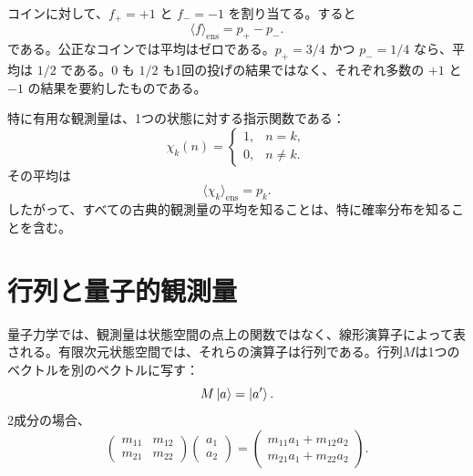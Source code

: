 コインに対して、\(f_+=+1\) と \(f_-=-1\) を割り当てる。すると
\begin{equation}
  \langle f\rangle_{\mathrm{ens}}
  =p_+-p_-.
  \label{eq:l02-coin-expectation}
\end{equation}
である。公正なコインでは平均はゼロである。\(p_+=3/4\) かつ \(p_-=1/4\) なら、平均は \(1/2\) である。\(0\) も \(1/2\) も1回の投げの結果ではなく、それぞれ多数の \(+1\) と \(-1\) の結果を要約したものである。

\begin{classroomqa}
\end{classroomqa}

特に有用な観測量は、1つの状態に対する指示関数である：
\begin{equation}
  \chi_k(n)=
  \begin{cases}
    1,&n=k,\\
    0,&n\ne k.
  \end{cases}
\end{equation}
その平均は
\begin{equation}
  \langle\chi_k\rangle_{\mathrm{ens}}=p_k.
\end{equation}
したがって、すべての古典的観測量の平均を知ることは、特に確率分布を知ることを含む。

\section{行列と量子的観測量}

量子力学では、観測量は状態空間の点上の関数ではなく、線形演算子によって表される。有限次元状態空間では、それらの演算子は行列である。行列\(M\)は1つのベクトルを別のベクトルに写す：
\begin{equation}
  M\left\lvert a\right\rangle=\left\lvert a'\right\rangle.
  \label{eq:l02-matrix-action}
\end{equation}
2成分の場合、
\begin{equation}
  \begin{pmatrix}
    m_{11}&m_{12}\\
    m_{21}&m_{22}
  \end{pmatrix}
  \begin{pmatrix}a_1\\a_2\end{pmatrix}
  =
  \begin{pmatrix}
    m_{11}a_1+m_{12}a_2\\
    m_{21}a_1+m_{22}a_2
  \end{pmatrix}.
  \label{eq:l02-matrix-components}
\end{equation}

